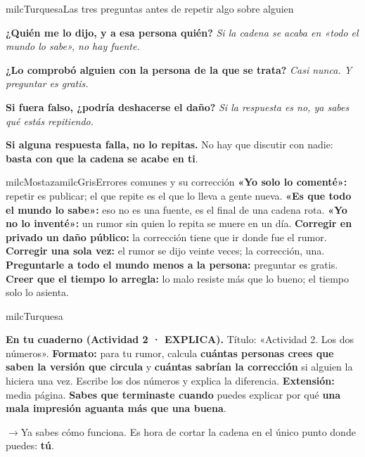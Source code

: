 \documentclass[11pt,letterpaper]{article}
\newcommand{\puente}[1]{%
  \begin{puentebox}%
    \textcolor{milcGradeDark}{$\rightarrow$}\hspace{2mm}#1%
  \end{puentebox}%
}
\begin{document}
\begin{drawbox}{milcTurquesa}{Las tres preguntas antes de repetir algo sobre alguien}
\begin{pasoslista}
\item \textbf{¿Quién me lo dijo, y a esa persona quién?} \emph{Si la cadena se acaba en «todo el mundo lo sabe», no hay fuente.}
\item \textbf{¿Lo comprobó alguien con la persona de la que se trata?} \emph{Casi nunca. Y preguntar es gratis.}
\item \textbf{Si fuera falso, ¿podría deshacerse el daño?} \emph{Si la respuesta es no, ya sabes qué estás repitiendo.}
\item \textbf{Si alguna respuesta falla, no lo repitas.} No hay que discutir con nadie: \textbf{basta con que la cadena se acabe en ti}.
\end{pasoslista}
\end{drawbox}

\begin{softbox}{milcMostaza}{milcGris}{Errores comunes y su corrección}
\textbf{«Yo solo lo comenté»:} repetir es publicar; el que repite es el que lo lleva a gente nueva. \textbf{«Es que todo el mundo lo sabe»:} eso no es una fuente, es el final de una cadena rota. \textbf{«Yo no lo inventé»:} un rumor sin quien lo repita se muere en un día. \textbf{Corregir en privado un daño público:} la corrección tiene que ir donde fue el rumor. \textbf{Corregir una sola vez:} el rumor se dijo veinte veces; la corrección, una. \textbf{Preguntarle a todo el mundo menos a la persona:} preguntar es gratis. \textbf{Creer que el tiempo lo arregla:} lo malo resiste más que lo bueno; el tiempo solo lo asienta.
\end{softbox}

\begin{infoband}{milcTurquesa}


\textbf{En tu cuaderno (Actividad 2 · EXPLICA).} Título: «Actividad 2. Los dos números». \textbf{Formato:} para tu rumor, calcula \textbf{cuántas personas crees que saben la versión que circula} y \textbf{cuántas sabrían la corrección} si alguien la hiciera una vez. Escribe los dos números y explica la diferencia. \textbf{Extensión:} media página. \textbf{Sabes que terminaste cuando} puedes explicar por qué \textbf{una mala impresión aguanta más que una buena}.
\end{infoband}

\puente{Ya sabes cómo funciona. Es hora de cortar la cadena en el único punto donde puedes: \textbf{tú}.}
\end{document}
